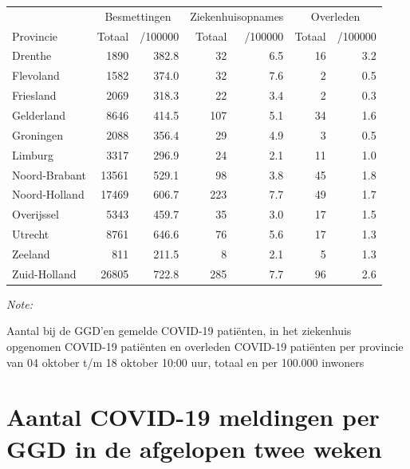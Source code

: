 \documentclass[
  english,
  man,floatsintext]{apa6}
\begin{document}
\begin{table}[H]
\centering
\begin{threeparttable}
\begin{tabular}{lrrrrrr}
\toprule
\multicolumn{1}{c}{ } & \multicolumn{2}{c}{Besmettingen} & \multicolumn{2}{c}{Ziekenhuisopnames} & \multicolumn{2}{c}{Overleden} \\
\cmidrule(l{3pt}r{3pt}){2-3} \cmidrule(l{3pt}r{3pt}){4-5} \cmidrule(l{3pt}r{3pt}){6-7}
Provincie & Totaal & /100000 & Totaal & /100000 & Totaal & /100000\\
\midrule
Drenthe & 1890 & 382.8 & 32 & 6.5 & 16 & 3.2\\
Flevoland & 1582 & 374.0 & 32 & 7.6 & 2 & 0.5\\
Friesland & 2069 & 318.3 & 22 & 3.4 & 2 & 0.3\\
Gelderland & 8646 & 414.5 & 107 & 5.1 & 34 & 1.6\\
Groningen & 2088 & 356.4 & 29 & 4.9 & 3 & 0.5\\
Limburg & 3317 & 296.9 & 24 & 2.1 & 11 & 1.0\\
Noord-Brabant & 13561 & 529.1 & 98 & 3.8 & 45 & 1.8\\
Noord-Holland & 17469 & 606.7 & 223 & 7.7 & 49 & 1.7\\
Overijssel & 5343 & 459.7 & 35 & 3.0 & 17 & 1.5\\
Utrecht & 8761 & 646.6 & 76 & 5.6 & 17 & 1.3\\
Zeeland & 811 & 211.5 & 8 & 2.1 & 5 & 1.3\\
Zuid-Holland & 26805 & 722.8 & 285 & 7.7 & 96 & 2.6\\
\bottomrule
\end{tabular}
\begin{tablenotes}
\item \textit{Note: } 
\item Aantal bij de GGD’en gemelde COVID-19 patiënten, in het ziekenhuis opgenomen COVID-19 patiënten en overleden COVID-19 patiënten per provincie van 04 oktober t/m 18 oktober 10:00 uur, totaal en per 100.000 inwoners
\end{tablenotes}
\end{threeparttable}
\end{table}

\newpage

\hypertarget{aantal-covid-19-meldingen-per-ggd-in-de-afgelopen-twee-weken}{%
\section{Aantal COVID-19 meldingen per GGD in de afgelopen twee weken}\label{aantal-covid-19-meldingen-per-ggd-in-de-afgelopen-twee-weken}}
\end{document}
